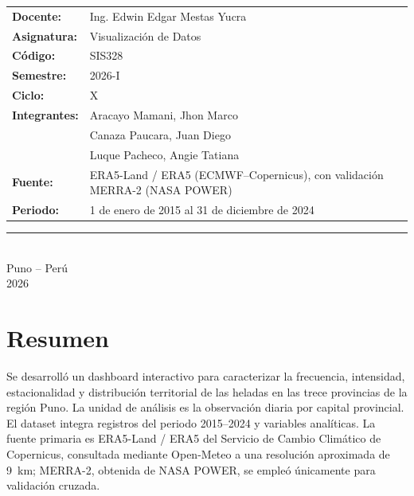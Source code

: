 \documentclass[11pt,a4paper]{article}
\begin{document}
\begin{titlepage}
\begin{center}
    \vspace{1.0cm}
    \renewcommand{\arraystretch}{1.35}
    \begin{tabular}{>{\bfseries}p{3.2cm}p{9.7cm}}
      Docente: & Ing. Edwin Edgar Mestas Yucra \\
      Asignatura: & Visualización de Datos \\
      Código: & SIS328 \\
      Semestre: & 2026-I \\
      Ciclo: & X \\
      Integrantes: & Aracayo Mamani, Jhon Marco \\
                   & Canaza Paucara, Juan Diego \\
                   & Luque Pacheco, Angie Tatiana \\
      Fuente: & ERA5-Land / ERA5 (ECMWF--Copernicus), con validación MERRA-2 (NASA POWER) \\
      Periodo: & 1 de enero de 2015 al 31 de diciembre de 2024
    \end{tabular}

    \vfill
    \textcolor{brandorange}{\rule{0.92\textwidth}{1.4pt}}\\[0.55cm]
    {\large Puno -- Perú}\\[0.15cm]
    {\large 2026}
  \end{center}
\end{titlepage}

\hypersetup{pageanchor=true}
\tableofcontents
\clearpage
\listoffigures
\clearpage
\listoftables
\clearpage
{}

\section{Resumen}

Se desarrolló un dashboard interactivo para caracterizar la frecuencia, intensidad,
estacionalidad y distribución territorial de las heladas en las trece provincias de la
región Puno. La unidad de análisis es la observación diaria por capital provincial. El
dataset integra \NRegistros{} registros del periodo 2015--2024 y \NVariables{} variables
analíticas. La fuente primaria es ERA5-Land / ERA5 del Servicio de Cambio Climático de
Copernicus, consultada mediante Open-Meteo a una resolución aproximada de 9~km; MERRA-2,
obtenida de NASA POWER, se empleó únicamente para validación cruzada.
\end{document}
